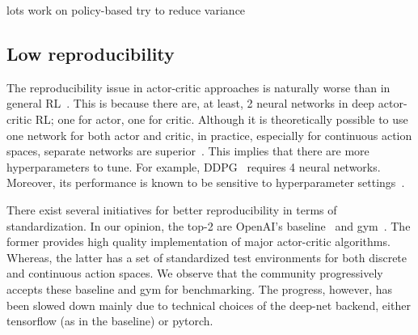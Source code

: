
lots work on policy-based try to reduce variance

\subsection{Low reproducibility}
The reproducibility issue in actor-critic approaches is naturally worse than in general RL~\cite{henderson2017reinforcement}.
This is because there are, at least, 2 neural networks in deep actor-critic RL;
one for actor, one for critic.
Although it is theoretically possible to use one network for both actor and critic,
in practice, especially for continuous action spaces, separate networks are superior~\cite{pmlr-v48-mniha16}.
This implies that there are more hyperparameters to tune.
For example, DDPG~\cite{LillicrapHPHETS15} requires 4 neural networks.
Moreover, its performance is known to be sensitive to hyperparameter settings~\cite{Duan:2016}.

There exist several initiatives for better reproducibility in terms of standardization.
In our opinion, the top-2 are OpenAI's baseline~\cite{baselines} and gym~\cite{1606.01540}.
The former provides high quality implementation of major actor-critic algorithms.
Whereas, the latter has a set of standardized test environments for both discrete and continuous action spaces.
We observe that the community progressively accepts these baseline and gym for benchmarking.
The progress, however, has been slowed down mainly due to technical choices of the deep-net backend,
either tensorflow (as in the baseline) or pytorch.
